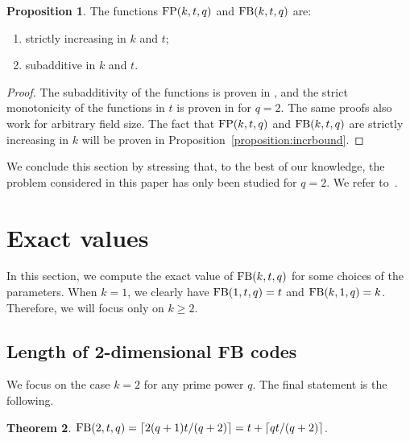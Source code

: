 \documentclass[11pt,a4paper]{article}
\theoremstyle{definition}
\newtheorem{theorem}{Theorem}[section]
\newtheorem{proposition}[theorem]{Proposition}
\newcommand{\F}{\mathbb F}
\newcommand{\fb}{\textnormal{FB}}
\newcommand{\fp}{\textnormal{FP}}
\begin{document}
\begin{proposition}
\label{prop:increase+additive}
The functions $\fp(k,t,q)$ and $\fb(k,t,q)$ are:
\begin{enumerate}
    \item  strictly increasing in $k$ and $t$;
    \item  subadditive in $k$ and $t$.
\end{enumerate}
\end{proposition}
\begin{proof}
The subadditivity of the functions is proven in \cite{nassar2021array}, and the strict monotonicity of the functions in $t$ is proven in \cite{zhang2020bounds} for $q=2$. The same proofs also work for arbitrary field size. The fact that $\fp(k,t,q)$ and $\fb(k,t,q)$ are strictly increasing in $k$ will be proven in Proposition~\ref{proposition:incrbound}.%
\end{proof}


We conclude this section by stressing that, to the best of our knowledge, the problem considered in this paper has only been studied for $q=2$. We refer to~\cite{yohananov2022almost,zhang2020bounds}.

\section{Exact values}
In this section, we compute the exact value of $\fb(k,t,q)$ for some choices of the parameters. When $k=1$, we clearly have $\fb(1,t,q)=t$ and $\fb(k,1,q)=k$. Therefore, we will focus only on $k \ge 2$.

\subsection{Length of 2-dimensional FB codes}

We focus on the case
$k=2$ for any prime power $q$. The final statement is the following.
\begin{theorem}
\label{thm:k=2}
$\fb(2,t,q)= \lceil 2(q+1)t/(q+2)\rceil = t +\lceil qt/(q+2)\rceil$.
\end{theorem}
\end{document}
